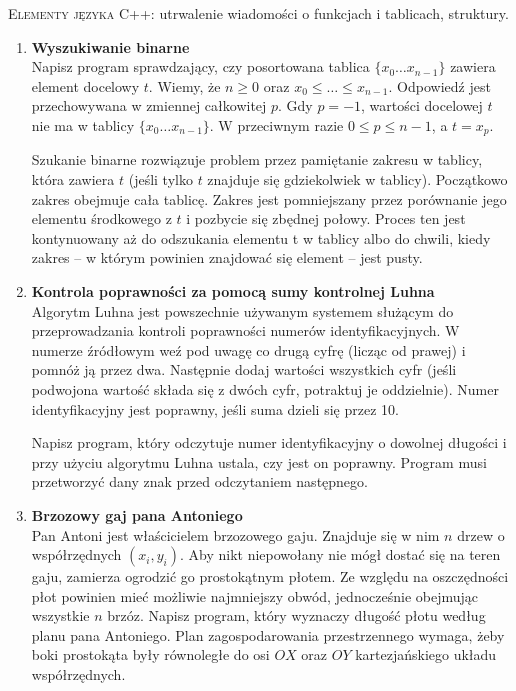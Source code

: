 \documentclass[12pt]{article}
\begin{document}
\small \textsc{Elementy języka C++:} utrwalenie wiadomości o funkcjach i tablicach, struktury.

\begin{enumerate}

\item \textbf{Wyszukiwanie binarne}\\
Napisz program sprawdzający, czy posortowana tablica $\{x_0\dots x_{n-1}\}$ zawiera element docelowy $t$. Wiemy, że $n\ge 0$ oraz $x_0\le \dots\le x_{n-1}$. Odpowiedź jest przechowywana w zmiennej całkowitej $p$. Gdy $p=-1$, wartości docelowej $t$ nie ma w tablicy $\{x_0\dots x_{n-1}\}$. W przeciwnym razie $0\le p\le n-1$, a $t=x_p$.

\vspace{0.2 cm}

Szukanie binarne rozwiązuje problem przez pamiętanie zakresu w tablicy, która zawiera $t$ (jeśli tylko $t$ znajduje się gdziekolwiek w tablicy). Początkowo zakres obejmuje cała tablicę. Zakres jest pomniejszany przez porównanie jego elementu środkowego z $t$ i pozbycie się zbędnej połowy. Proces ten jest kontynuowany aż do odszukania elementu t w tablicy albo do chwili, kiedy zakres -- w którym powinien znajdować się element -- jest pusty.

\item \textbf{Kontrola poprawności za pomocą sumy kontrolnej Luhna}\\
Algorytm Luhna jest powszechnie używanym systemem służącym do przeprowadzania kontroli poprawności numerów identyfikacyjnych. W numerze źródłowym weź pod uwagę co drugą cyfrę (licząc od prawej) i pomnóż ją przez dwa. Następnie dodaj wartości wszystkich cyfr (jeśli podwojona wartość składa się z dwóch cyfr, potraktuj je oddzielnie). Numer identyfikacyjny jest poprawny, jeśli suma dzieli się przez 10.

Napisz program, który odczytuje numer identyfikacyjny o dowolnej długości i przy użyciu algorytmu Luhna ustala, czy jest on poprawny. Program musi przetworzyć dany znak przed odczytaniem następnego.

\item \textbf{Brzozowy gaj pana Antoniego}\\
Pan Antoni jest właścicielem brzozowego gaju. Znajduje się w nim $n$ drzew o współrzędnych $(x_i,y_i)$. Aby nikt niepowołany nie mógł dostać się na teren gaju, zamierza ogrodzić go prostokątnym płotem. Ze względu na oszczędności płot powinien mieć możliwie najmniejszy obwód, jednocześnie obejmując wszystkie $n$ brzóz. Napisz program, który wyznaczy długość płotu według planu pana Antoniego. Plan zagospodarowania przestrzennego wymaga, żeby boki prostokąta były równoległe do osi $OX$ oraz $OY$ kartezjańskiego układu współrzędnych. 


\end{enumerate}
\end{document}
